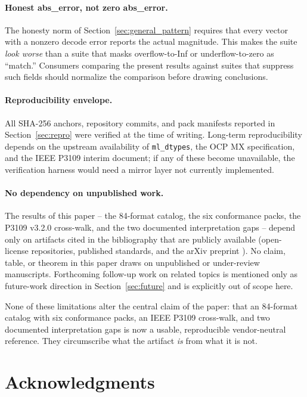 \documentclass[11pt,letterpaper]{article}
\begin{document}
\paragraph{Honest abs\_error, not zero abs\_error.}
The honesty norm of Section~\ref{sec:general_pattern} requires that every
vector with a nonzero decode error reports the actual magnitude.  This
makes the suite \emph{look worse} than a suite that masks overflow-to-Inf
or underflow-to-zero as ``match.''  Consumers comparing the present
results against suites that suppress such fields should normalize the
comparison before drawing conclusions.

\paragraph{Reproducibility envelope.}
All SHA-256 anchors, repository commits, and pack manifests reported in
Section~\ref{sec:repro} were verified at the time of writing.  Long-term
reproducibility depends on the upstream availability of
\texttt{ml\_dtypes}, the OCP MX specification, and the IEEE P3109 interim
document; if any of these become unavailable, the verification harness
would need a mirror layer not currently implemented.

\paragraph{No dependency on unpublished work.}
The results of this paper -- the 84-format catalog, the six conformance
packs, the P3109 v3.2.0 cross-walk, and the two documented interpretation
gaps -- depend only on artifacts cited in the bibliography that are
publicly available (open-license repositories, published standards, and the
arXiv preprint \cite{gf_arxiv}).  No claim, table, or theorem in this paper
draws on unpublished or under-review manuscripts.  Forthcoming follow-up
work on related topics is mentioned only as future-work direction in
Section~\ref{sec:future} and is explicitly out of scope here.

None of these limitations alter the central claim of the paper: that an
84-format catalog with six conformance packs, an IEEE P3109 cross-walk,
and two documented interpretation gaps is now a usable, reproducible
vendor-neutral reference.  They circumscribe what the artifact \emph{is}
from what it is not.

\section*{Acknowledgments}
\end{document}
